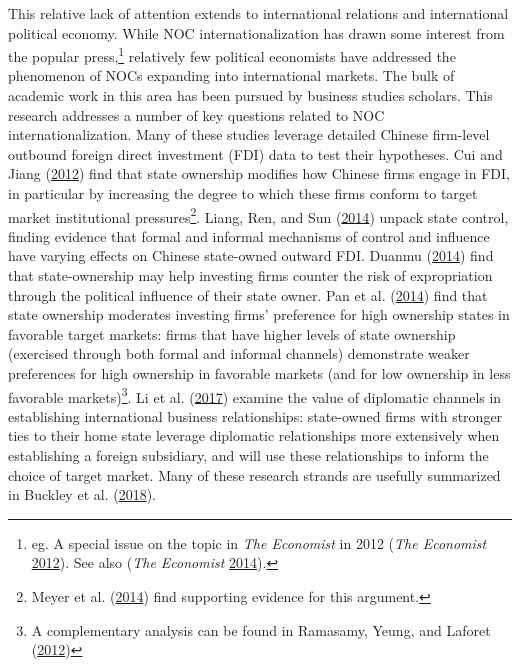 \documentclass[11pt,]{book}
\begin{document}
This relative lack of attention extends to international relations and international political economy. While NOC internationalization has drawn some interest from the popular press,\footnote{eg. A special issue on the topic in \emph{The Economist} in 2012 (\emph{The Economist} \protect\hyperlink{ref-noauthor_new_2012}{2012}). See also (\emph{The Economist} \protect\hyperlink{ref-noauthor_leviathan_2014}{2014}).} relatively few political economists have addressed the phenomenon of NOCs expanding into international markets. The bulk of academic work in this area has been pursued by business studies scholars. This research addresses a number of key questions related to NOC internationalization. Many of these studies leverage detailed Chinese firm-level outbound foreign direct investment (FDI) data to test their hypotheses. Cui and Jiang (\protect\hyperlink{ref-cui_state_2012}{2012}) find that state ownership modifies how Chinese firms engage in FDI, in particular by increasing the degree to which these firms conform to target market institutional pressures\footnote{Meyer et al. (\protect\hyperlink{ref-meyer_overcoming_2014}{2014}) find supporting evidence for this argument.}. Liang, Ren, and Sun (\protect\hyperlink{ref-liang_anatomy_2014}{2014}) unpack state control, finding evidence that formal and informal mechanisms of control and influence have varying effects on Chinese state-owned outward FDI. Duanmu (\protect\hyperlink{ref-duanmu_state-owned_2014}{2014}) find that state-ownership may help investing firms counter the risk of expropriation through the political influence of their state owner. Pan et al. (\protect\hyperlink{ref-pan_firms_2014}{2014}) find that state ownership moderates investing firms' preference for high ownership states in favorable target markets: firms that have higher levels of state ownership (exercised through both formal and informal channels) demonstrate weaker preferences for high ownership in favorable markets (and for low ownership in less favorable markets)\footnote{A complementary analysis can be found in Ramasamy, Yeung, and Laforet (\protect\hyperlink{ref-ramasamy_chinas_2012}{2012})}. Li et al. (\protect\hyperlink{ref-li_diplomatic_2017}{2017}) examine the value of diplomatic channels in establishing international business relationships: state-owned firms with stronger ties to their home state leverage diplomatic relationships more extensively when establishing a foreign subsidiary, and will use these relationships to inform the choice of target market. Many of these research strands are usefully summarized in Buckley et al. (\protect\hyperlink{ref-buckley_retrospective_2018}{2018}).
\end{document}
